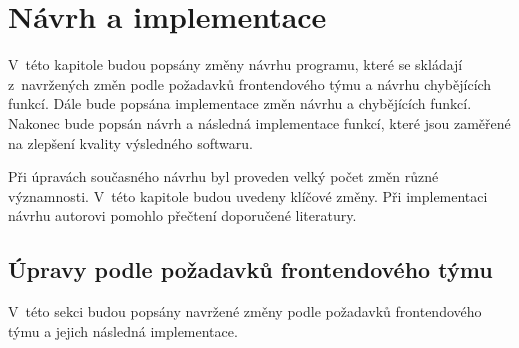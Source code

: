 \chapter{Návrh a implementace}\label{chapter:navrh}
V~této kapitole budou popsány změny návrhu programu, které se skládají z~navržených změn podle požadavků frontendového týmu a návrhu chybějících funkcí. Dále bude popsána implementace změn návrhu a chybějících funkcí. Nakonec bude popsán návrh a následná implementace funkcí, které jsou zaměřené na zlepšení kvality výsledného softwaru.

Při úpravách současného návrhu byl proveden  velký počet změn různé významnosti. V~této kapitole budou uvedeny klíčové změny. Při implementaci návrhu autorovi pomohlo přečtení doporučené literatury.\cite{pro-spring-boot-2}

\section{Úpravy podle požadavků frontendového týmu}\label{navrh:upravy}
    V~této sekci budou popsány navržené změny podle požadavků frontendového týmu a jejich následná implementace.
    

